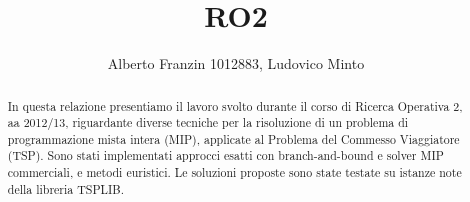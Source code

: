 \documentclass[a4paper,11pt]{report}
\author{Alberto Franzin 1012883, Ludovico Minto}
\title{RO2}
\begin{document}
\maketitle

\begin{abstract}
In questa relazione presentiamo il lavoro svolto durante il corso di Ricerca Operativa 2, aa 2012/13, riguardante diverse tecniche per la risoluzione di un problema di programmazione mista intera (MIP), applicate al Problema del Commesso Viaggiatore (TSP). Sono stati implementati approcci esatti con branch-and-bound e solver MIP commerciali, e metodi euristici. Le soluzioni proposte sono state testate su istanze note della libreria TSPLIB.
\end{abstract}

\tableofcontents









\end{document}

